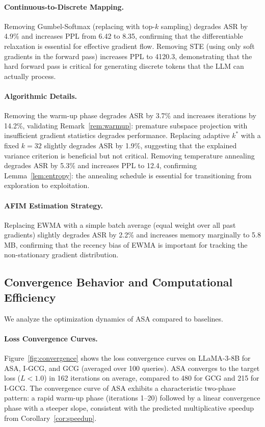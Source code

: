 ﻿\documentclass[lettersize,journal]{IEEEtran}
\begin{document}
\paragraph{Continuous-to-Discrete Mapping.} Removing Gumbel-Softmax (replacing with top-$k$ sampling) degrades ASR by 4.9\% and increases PPL from 6.42 to 8.35, confirming that the differentiable relaxation is essential for effective gradient flow. Removing STE (using only soft gradients in the forward pass) increases PPL to 4120.3, demonstrating that the hard forward pass is critical for generating discrete tokens that the LLM can actually process.

\paragraph{Algorithmic Details.} Removing the warm-up phase degrades ASR by 3.7\% and increases iterations by 14.2\%, validating Remark~\ref{rem:warmup}: premature subspace projection with insufficient gradient statistics degrades performance. Replacing adaptive $k^*$ with a fixed $k = 32$ slightly degrades ASR by 1.9\%, suggesting that the explained variance criterion is beneficial but not critical. Removing temperature annealing degrades ASR by 5.3\% and increases PPL to 12.4, confirming Lemma~\ref{lem:entropy}: the annealing schedule is essential for transitioning from exploration to exploitation.

\paragraph{AFIM Estimation Strategy.} Replacing EWMA with a simple batch average (equal weight over all past gradients) slightly degrades ASR by 2.2\% and increases memory marginally to 5.8 MB, confirming that the recency bias of EWMA is important for tracking the non-stationary gradient distribution.

\subsection{Convergence Behavior and Computational Efficiency}
\label{sec:convergence_analysis}

We analyze the optimization dynamics of ASA compared to baselines.

\paragraph{Loss Convergence Curves.} Figure~\ref{fig:convergence} shows the loss convergence curves on LLaMA-3-8B for ASA, I-GCG, and GCG (averaged over 100 queries). ASA converges to the target loss ($L < 1.0$) in 162 iterations on average, compared to 480 for GCG and 215 for I-GCG. The convergence curve of ASA exhibits a characteristic two-phase pattern: a rapid warm-up phase (iterations 1--20) followed by a linear convergence phase with a steeper slope, consistent with the predicted multiplicative speedup from Corollary~\ref{cor:speedup}.
\end{document}
